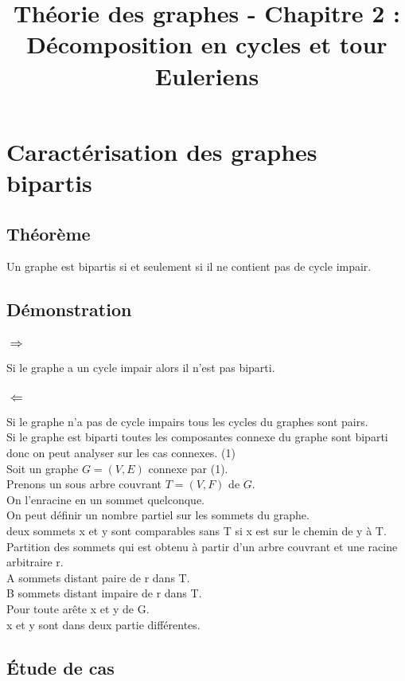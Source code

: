 \documentclass{article}
\title{Théorie des graphes - Chapitre 2 : Décomposition en cycles et tour Euleriens }
\author{}
\date{}
\begin{document}
\maketitle{}
\tableofcontents
\newpage
\section{Caractérisation des graphes bipartis}
\subsection*{Théorème}
Un graphe est bipartis si et seulement si il ne contient pas de cycle impair.
\subsection*{Démonstration}
\subsubsection*{$\Rightarrow$}
Si le graphe a un cycle impair alors il n’est pas biparti.
\subsubsection*{$\Leftarrow$}
Si le graphe n’a pas de cycle impairs tous les cycles du graphes sont pairs. \\
Si le graphe est biparti toutes les composantes connexe du graphe sont biparti donc on peut analyser  sur les cas connexes. (1) \\
Soit un graphe $G=(V,E)$ connexe par (1). \\
Prenons un sous arbre couvrant $T=(V,F)$ de $G$. \\
On l’enracine en un sommet quelconque. \\
On peut définir un nombre partiel sur les sommets du graphe. \\
deux sommets x et y sont comparables sans T si x est sur le chemin de y à T. \\  
Partition des sommets qui est obtenu à partir d’un arbre couvrant et une racine arbitraire r. \\
A sommets distant paire de r dans T. \\
B sommets distant impaire de r dans T. \\
Pour toute arête x et y de G. \\
x et y sont dans deux partie différentes. \\
\subsection*{Étude de cas}
\end{document}
